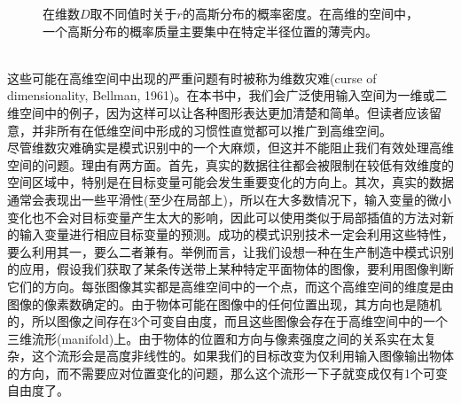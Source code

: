 \documentclass[b5paper]{book}
\numberwithin{equation}{chapter}
\begin{document}
{\begin{figure}[ht]
		\caption{在维数$D$取不同值时关于$r$的高斯分布的概率密度。在高维的空间中，一个高斯分布的概率质量主要集中在特定半径位置的薄壳内。}
		\label{fig:1-23}
	\end{figure}
	\\
	\indent 这些可能在高维空间中出现的严重问题有时被称为维数灾难(curse of dimensionality, Bellman, 1961)。在本书中，我们会广泛使用输入空间为一维或二维空间中的例子，因为这样可以让各种图形表达更加清楚和简单。但读者应该留意，并非所有在低维空间中形成的习惯性直觉都可以推广到高维空间。\\
	\indent 尽管维数灾难确实是模式识别中的一个大麻烦，但这并不能阻止我们有效处理高维空间的问题。理由有两方面。首先，真实的数据往往都会被限制在较低有效维度的空间区域中，特别是在目标变量可能会发生重要变化的方向上。其次，真实的数据通常会表现出一些平滑性(至少在局部上)，所以在大多数情况下，输入变量的微小变化也不会对目标变量产生太大的影响，因此可以使用类似于局部插值的方法对新的输入变量进行相应目标变量的预测。成功的模式识别技术一定会利用这些特性，要么利用其一，要么二者兼有。举例而言，让我们设想一种在生产制造中模式识别的应用，假设我们获取了某条传送带上某种特定平面物体的图像，要利用图像判断它们的方向。每张图像其实都是高维空间中的一个点，而这个高维空间的维度是由图像的像素数确定的。由于物体可能在图像中的任何位置出现，其方向也是随机的，所以图像之间存在3个可变自由度，而且这些图像会存在于高维空间中的一个三维流形(manifold)上。由于物体的位置和方向与像素强度之间的关系实在太复杂，这个流形会是高度非线性的。如果我们的目标改变为仅利用输入图像输出物体的方向，而不需要应对位置变化的问题，那么这个流形一下子就变成仅有1个可变自由度了。
	}
\end{document}
